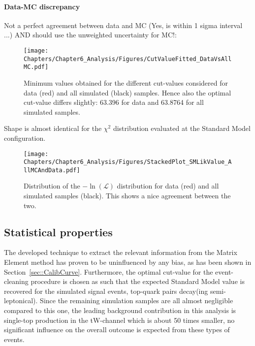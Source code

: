 \paragraph{Data-MC discrepancy}
Not a perfect agreement between data and MC (Yes, is within 1 sigma interval ...) AND should use the unweighted uncertainty for MC!:
\begin{figure}[h!t]
 \centering
 \texttt{[image: Chapters/Chapter6\_Analysis/Figures/CutValueFitted\_DataVsAllMC.pdf]}
 \caption{Minimum values obtained for the different cut-values considered for data (red) and all simulated (black) samples. Hence also the optimal cut-value differs slightly: 63.396 for data and 63.8764 for all simulated samples.}
\end{figure}

Shape is almost identical for the $\chi^{2}$ distribution evaluated at the Standard Model configuration.
\begin{figure}[h!t]
 \centering
 \texttt{[image: Chapters/Chapter6\_Analysis/Figures/StackedPlot\_SMLikValue\_AllMCAndData.pdf]}
 \caption{Distribution of the $-\ln(\mathcal{L})$ distribution for data (red) and all simulated samples (black). This shows a nice agreement between the two.}
\end{figure}



\subsection{Statistical properties}
The developed technique to extract the relevant information from the Matrix Element method has proven to be uninfluenced by any bias, as has been shown in Section~\ref{sec::CalibCurve}.
Furthermore, the optimal cut-value for the event-cleaning procedure is chosen as such that the expected Standard Model value is recovered for the simulated signal events, top-quark pairs decay(ing semi-leptonical). Since the remaining simulation samples are all almost negligible compared to this one, the leading background contribution in this analysis is single-top production in the tW-channel which is about 50 times smaller, no significant influence on the overall outcome is expected from these types of events.
\\

